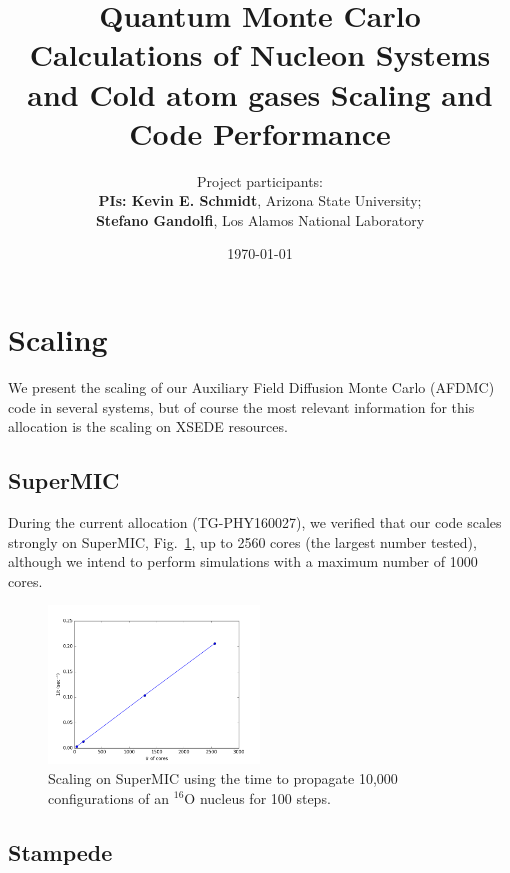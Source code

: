 \documentclass[12pt,letterpaper]{article}
\newcommand{\project}{\large Quantum Monte Carlo Calculations of Nucleon 
Systems and Cold atom gases \vskip 0.5cm}
\begin{document}
\onehalfspacing
\title{\project {\Large \textbf{Scaling and Code Performance}} \vspace{0cm}}
\author{
Project participants:\\
{\bf PIs: Kevin E. Schmidt}, Arizona State University; \\
{\bf Stefano Gandolfi}, Los Alamos National Laboratory\\
}
\date{\today}
\maketitle
\section{Scaling}
We present the scaling of our Auxiliary Field Diffusion Monte Carlo (AFDMC) 
code in several systems, but of course the 
most relevant information for this allocation is the scaling on XSEDE 
resources.

\subsection{SuperMIC}
During the current allocation (TG-PHY160027), we verified that our code scales 
strongly on SuperMIC, Fig.~\ref{fig:supermic}, up to 2560 cores (the largest 
number tested), although we intend to perform 
simulations with a maximum number of 1000 cores.

\begin{figure}[h]
   \centering
   \includegraphics[width=0.5\textwidth]{supermic.png}
   \caption{Scaling on SuperMIC using the time to propagate 10,000 
   configurations of an $^{16}$O nucleus for 100 steps.}
   \label{fig:supermic}
\end{figure}

\subsection{Stampede}
\end{document}
